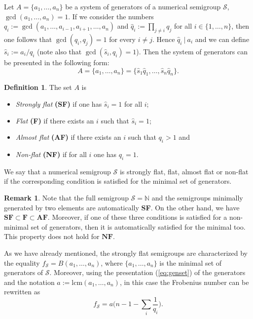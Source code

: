\documentclass[oneside]{amsart}
\numberwithin{equation}{section}
\numberwithin{equation}{subsection}
\theoremstyle{plain}
\theoremstyle{definition}
\newtheorem{remark}[equation]{Remark}
\newtheorem{definition}[equation]{Definition}
\newcommand{\calS}{{\mathcal S}}\newcommand{\cals}{{\bf s}}\newcommand{\calst}{{\bf st}}\newcommand{\cS}{{\mathcal S}}
\newcommand{\q}{q}
\begin{document}
Let $A=\{a_1,\dots,a_n\}$ be a system of generators of a 
numerical semigroup $\calS$, $\gcd(a_1,\dots,a_n) =1$. If we consider the numbers $\q_i:=\gcd(a_1,\dots,a_{i-1},a_{i+1},\dots, a_n)$ and $\widehat{\q}_i:=\prod_{j\neq i} \q_j$ for all $i\in\{1,\dots,n\}$, then one follows that $\gcd(\q_i,\q_j)=1$ for every $ i\neq j$. Hence $\widehat{\q}_i \ | \ a_i$ and we can define $\widehat{s}_i:=a_i/\widehat{\q}_i$ (note also that $\gcd(\widehat{s}_i,\q_i)=1$). Then the system of generators can be presented in the following form:
\begin{equation}\label{eq:genset}
 A=\{a_1,\dots,a_n\}=\{\widehat{s}_1 \widehat{\q}_1,\dots, \widehat{s}_n \widehat{\q}_n\}.
\end{equation}

\begin{definition}
    \label{df:flatnes}
The set $A$ is 
   \begin{itemize}
       \item {\it Strongly flat} {\bf (SF)} if  one has $\widehat{s}_i=1$ for all $i$;
       \item {\it Flat} {\bf (F)}  if there exists an $i$ such that $\widehat{s}_i=1$;
       \item {\it Almost flat} { \bf (AF)} if there exists an $i$ such that $\q_i>1$ and 
       \item {\it Non-flat} {\bf (NF)} if  for all $i$ one has $\q_i=1$.
   \end{itemize} 
We say that a numerical semigroup $\calS$ is strongly flat, flat, almost flat or non-flat if the corresponding condition is satisfied for the minimal set of generators. 
\end{definition}
\begin{remark}
Note that the full semigroup $\calS=\mathbb{N}$ and the semigroups minimally generated by two elements are automatically {\bf SF}. On the other hand, we have $\textbf{SF}\subset \textbf{F}\subset \textbf{AF}$. Moreover, if one of these three conditions is satisfied for a non-minimal set of generators, then it is automatically satisfied for the minimal too.  This property does not hold for $\textbf{NF}$. 
\end{remark}

As we have already mentioned, the strongly flat semigroups are characterized by the equality $f_{\calS}=B(a_1,\dots,a_n)$, where  $\{a_1,\dots,a_n\}$ is the minimal set of generators of $\calS$. 
Moreover, using the presentation (\ref{eq:genset}) of the generators 
and the notation $a:=\mathrm{lcm}(a_1,\dots,a_n)$, in this case the Frobenius number can be rewritten as 
$$
f_{\calS}=a\Big(n-1-\sum_i \frac{1}{\q_i}\Big).    
$$
\end{document}
